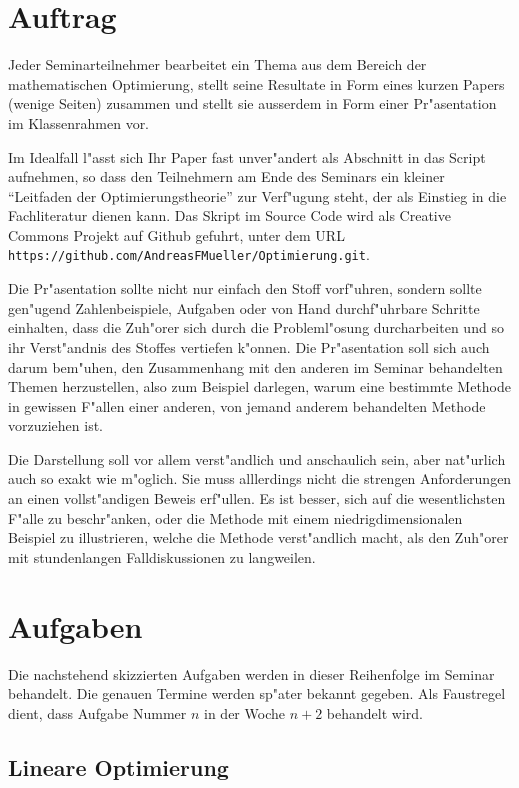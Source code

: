 \documentclass[a4paper,12pt]{article}
\begin{document}
\section{Auftrag}
Jeder Seminarteilnehmer bearbeitet ein Thema aus dem Bereich der
mathematischen Optimierung, stellt seine Resultate in Form eines
kurzen Papers (wenige Seiten) zusammen und stellt sie ausserdem
in Form einer Pr"asentation im Klassenrahmen vor.

Im Idealfall l"asst sich Ihr Paper fast unver"andert als Abschnitt
in das Script aufnehmen, so dass den Teilnehmern am Ende des Seminars
ein kleiner ``Leitfaden der Optimierungstheorie'' zur Verf"ugung steht,
der als Einstieg in die Fachliteratur dienen kann.
Das Skript im Source Code wird als Creative Commons Projekt auf
Github gefuhrt, unter dem URL
{\tt https://github.com/AndreasFMueller/Optimierung.git}.

Die Pr"asentation sollte nicht nur einfach den Stoff vorf"uhren,
sondern sollte gen"ugend Zahlenbeispiele, Aufgaben oder von Hand
durchf"uhrbare Schritte einhalten, dass die Zuh"orer sich durch
die Probleml"osung durcharbeiten und so ihr Verst"andnis des
Stoffes vertiefen k"onnen. Die Pr"asentation soll sich auch darum
bem"uhen, den Zusammenhang mit den anderen im Seminar behandelten
Themen herzustellen, also zum Beispiel darlegen, warum eine bestimmte
Methode in gewissen F"allen einer anderen, von jemand anderem behandelten
Methode vorzuziehen ist.

Die Darstellung soll vor allem verst"andlich und anschaulich
sein, aber nat"urlich auch so exakt wie m"oglich.
Sie muss alllerdings nicht die strengen Anforderungen an einen
vollst"andigen Beweis erf"ullen. Es ist besser, sich auf die
wesentlichsten F"alle zu beschr"anken, oder die Methode mit
einem niedrigdimensionalen Beispiel zu illustrieren, welche
die Methode verst"andlich macht, als den Zuh"orer mit stundenlangen
Falldiskussionen zu langweilen.

\section{Aufgaben}
Die nachstehend skizzierten Aufgaben werden in dieser Reihenfolge im
Seminar behandelt. Die genauen Termine werden sp"ater bekannt
gegeben. Als Faustregel dient, dass Aufgabe Nummer $n$ in der Woche
$n + 2$ behandelt wird.

\newtheorem{aufgabe}{Aufgabe}

\subsection{Lineare Optimierung}



\end{document}
